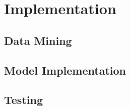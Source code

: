 \chapter{Implementation}\label{ch:implementation}

\section{Data Mining}

\section{Model Implementation}

\section{Testing}

